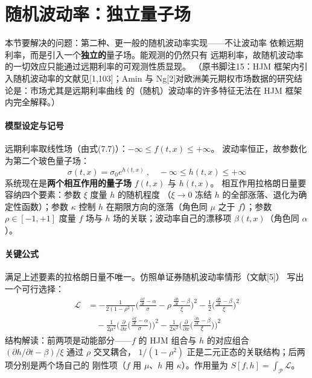 \section{随机波动率：独立量子场}

本节要解决的问题：第二种、更一般的随机波动率实现——不让波动率
依赖远期利率，而是引入一个\textbf{独立的}量子场。能观测的仍然只有
远期利率，故随机波动率的一切效应只能通过远期利率的可观测性质显现。
（原书脚注15：HJM 框架内引入随机波动率的文献见[1,103]；Amin 与
Ng[2]对欧洲美元期权市场数据的研究结论是：市场尤其是远期利率曲线
的（随机）波动率的许多特征无法在 HJM 框架内完全解释。）

\paragraph{模型设定与记号}
远期利率取线性场（由式(7.7)）：$-\infty\leq f(t,x)\leq+\infty$。
波动率恒正，故参数化为第二个玻色量子场：
\begin{equation*}
\sigma(t,x)=\sigma_0e^{h(t,x)}\ ,\quad
-\infty\leq h(t,x)\leq+\infty
\end{equation*}
系统现在是\textbf{两个相互作用的量子场} $f(t,x)$ 与 $h(t,x)$。
相互作用拉格朗日量要容纳四个要素：参数 $\xi$ 度量 $h$ 的随机程度
（$\xi\to0$ 冻结 $h$ 的全部涨落、退化为确定性函数）；参数 $\kappa$
控制 $h$ 在期限方向的涨落（角色同 $\mu$ 之于 $f$）；参数
$\rho\in[-1,+1]$ 度量 $f$ 场与 $h$ 场的关联；波动率自己的漂移项
$\beta(t,x)$（角色同 $\alpha$）。

\paragraph{关键公式}
满足上述要素的拉格朗日量不唯一。仿照单证券随机波动率情形（文献[5]）
写出一个可行选择：
\begin{align*}
\mathcal{L}&=-\frac{1}{2(1-\rho^{2})}\biggl(\frac{\frac{\partial f}
{\partial t}-\alpha}{\sigma}
-\rho\,\frac{\frac{\partial h}{\partial t}-\beta}{\xi}\biggr)^{2}
-\frac{1}{2}\biggl(\frac{\frac{\partial h}{\partial t}-\beta}
{\xi}\biggr)^{2}\\
&\quad-\frac{1}{2\mu^{2}}\biggl(\frac{\partial}{\partial x}
\biggl(\frac{\frac{\partial f}{\partial t}-\alpha}{\sigma}\biggr)
\biggr)^{2}
-\frac{1}{2\kappa^{2}}\biggl(\frac{\partial}{\partial x}
\biggl(\frac{\frac{\partial h}{\partial t}-\beta}{\xi}\biggr)
\biggr)^{2}
\tag{7.60}
\end{align*}
结构解读：前两项是动能部分——$f$ 的 HJM 组合与 $h$ 的对应组合
$(\partial h/\partial t-\beta)/\xi$ 通过 $\rho$ 交叉耦合，
$1/(1-\rho^2)$ 正是二元正态的关联结构；后两项分别是两个场自己的
刚性项（$f$ 用 $\mu$、$h$ 用 $\kappa$）。作用量为
$S[f,h]=\int_{\mathcal{P}}\mathcal{L}$。

